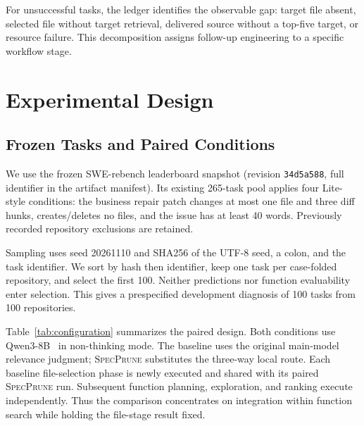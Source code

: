 \documentclass{svproc}
\newcommand{\specprune}{\textsc{SpecPrune}}
\begin{document}
For unsuccessful tasks, the ledger identifies the observable gap: target file absent, selected file without target retrieval, delivered source without a top-five target, or resource failure. This decomposition assigns follow-up engineering to a specific workflow stage.

\section{Experimental Design}
\subsection{Frozen Tasks and Paired Conditions}
We use the frozen SWE-rebench leaderboard snapshot (revision \texttt{34d5a588}, full identifier in the artifact manifest). Its existing 265-task pool applies four Lite-style conditions: the business repair patch changes at most one file and three diff hunks, creates/deletes no files, and the issue has at least 40 words. Previously recorded repository exclusions are retained.

Sampling uses seed 20261110 and SHA256 of the UTF-8 seed, a colon, and the task identifier. We sort by hash then identifier, keep one task per case-folded repository, and select the first 100. Neither predictions nor function evaluability enter selection. This gives a prespecified development diagnosis of 100 tasks from 100 repositories.

Table~\ref{tab:configuration} summarizes the paired design. Both conditions use Qwen3-8B~\cite{qwen3report2025} in non-thinking mode. The baseline uses the original main-model relevance judgment; \specprune{} substitutes the three-way local route. Each baseline file-selection phase is newly executed and shared with its paired \specprune{} run. Subsequent function planning, exploration, and ranking execute independently. Thus the comparison concentrates on integration within function search while holding the file-stage result fixed.
\end{document}
